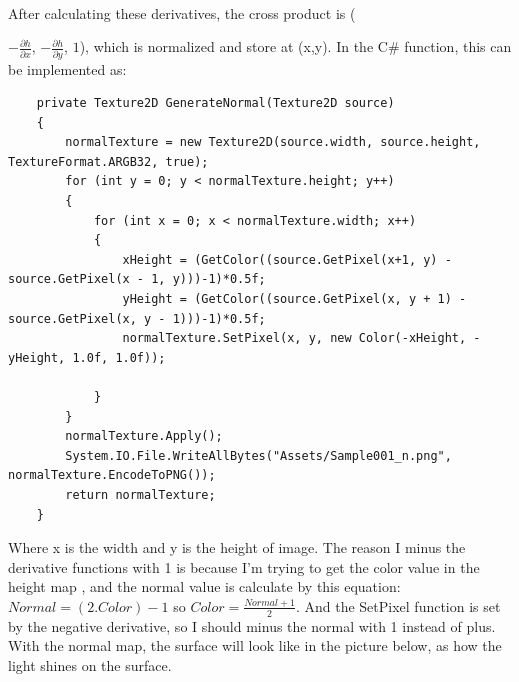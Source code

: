 \documentclass[a4paper, 13pt]{extarticle}
\begin{document}
\\[0.2cm] After calculating these derivatives, the cross product is ({$-\frac{\partial h}{\partial x}$, $-\frac{\partial h}{\partial y}$, $1$), which is normalized and store at (x,y). In the C\# function, this can be implemented as: \begin{lstlisting}
	private Texture2D GenerateNormal(Texture2D source)
	{
		normalTexture = new Texture2D(source.width, source.height, TextureFormat.ARGB32, true);
		for (int y = 0; y < normalTexture.height; y++)
		{
			for (int x = 0; x < normalTexture.width; x++)
			{
				xHeight = (GetColor((source.GetPixel(x+1, y) - source.GetPixel(x - 1, y)))-1)*0.5f;
				yHeight = (GetColor((source.GetPixel(x, y + 1) - source.GetPixel(x, y - 1)))-1)*0.5f;
				normalTexture.SetPixel(x, y, new Color(-xHeight, -yHeight, 1.0f, 1.0f));
	
			}
		}
		normalTexture.Apply();
		System.IO.File.WriteAllBytes("Assets/Sample001_n.png", normalTexture.EncodeToPNG());
		return normalTexture;
	}
	\end{lstlisting}
 Where x is the width and y is the height of image. The reason I minus the derivative functions with 1 is because I'm trying to get the color value in the height map , and the normal value is calculate by this equation: $ Normal = (2.Color) - 1 $ so $ Color = \frac{Normal + 1}{2}$. And the SetPixel function is set by the negative derivative, so I should minus the normal with 1 instead of plus. With the normal map, the surface will look like in the picture below, as how the light shines on the surface.
 
}
\end{document}
